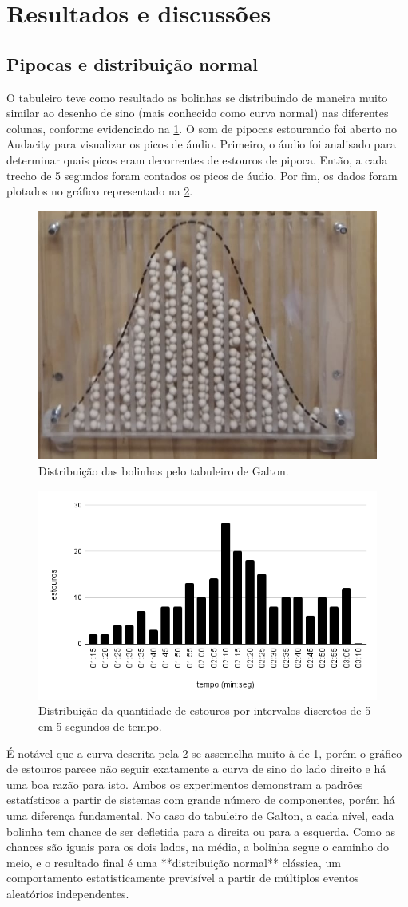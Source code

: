 \section{Resultados e discussões}

\subsection{Pipocas e distribuição normal}
O tabuleiro teve como resultado as bolinhas se distribuindo de maneira muito similar ao desenho de sino (mais conhecido como curva normal) nas diferentes colunas, conforme evidenciado na \cref{distbolinha}. O som de pipocas estourando foi aberto no Audacity para visualizar os picos de áudio. Primeiro, o áudio foi analisado para determinar quais picos eram decorrentes de estouros de pipoca. Então, a cada trecho de 5 segundos foram contados os picos de áudio. Por fim, os dados foram plotados no gráfico representado na \cref{estouros}.

\begin{figure}[H]
    \centering
    \includegraphics[width=.5\linewidth]{fig/DistNorm}
    \caption{Distribuição das bolinhas pelo tabuleiro de Galton.}\label{distbolinha}
\end{figure}
\begin{figure}[H]
    \centering
    \includegraphics[width=.5\linewidth]{fig/distEstouros}
    \caption{Distribuição da quantidade de estouros por intervalos discretos de 5 em 5 segundos de tempo.}\label{estouros}
\end{figure}

É notável que a curva descrita pela \cref{estouros} se assemelha muito à de \cref{distbolinha}, porém o gráfico de estouros parece não seguir exatamente a curva de sino do lado direito e há uma boa razão para isto. Ambos os experimentos demonstram a padrões estatísticos a partir de sistemas com grande número de componentes, porém há uma diferença fundamental. No caso do tabuleiro de Galton, a cada nível, cada bolinha tem chance de ser defletida para a direita ou para a esquerda. Como as chances são iguais para os dois lados, na média, a bolinha segue o caminho do meio, e o resultado final é uma **distribuição normal** clássica, um comportamento estatisticamente previsível a partir de múltiplos eventos aleatórios independentes.

